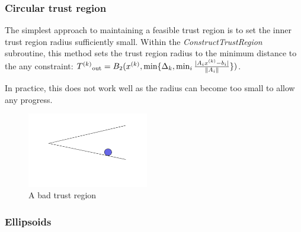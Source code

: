 
\subsubsection{Circular trust region}
The simplest approach to maintaining a feasible trust region is to set the inner trust region radius sufficiently small.
Within the \emph{ConstructTrustRegion} subroutine, this method sets the trust region radius to the minimum distance to the any constraint:
${T^{(k)}}_{\text{out}} = B_2({x}^{(k)}, \min\{\Delta_k, \min_{i}\frac{|A_i{x}^{(k)} - b_i|}{\|A_i\|} \})$.

In practice, this does not work well as the radius can become too small to allow any progress.

\begin{figure}[h]
    \centering
    \includegraphics[width=200px]{images/BAD_CIRCLE.png}
    \caption{A bad trust region}
\end{figure}


    
\subsubsection{Ellipsoids}

